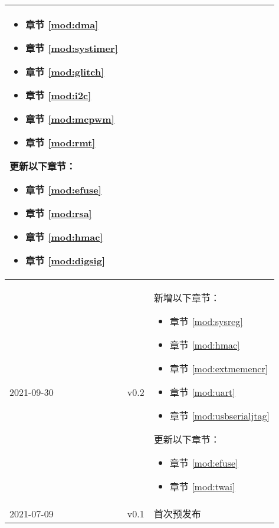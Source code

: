 \begin{longtable}[l]{ | m{2cm} | m{1.5cm} | m{12cm} | }
\begin{itemize}
            \item 章节 \ref{mod:dma} \textit{\nameref{mod:dma}}
            \item 章节 \ref{mod:systimer} \textit{\nameref{mod:systimer}}
            \item 章节 \ref{mod:glitch} \textit{\nameref{mod:glitch}}
            \item 章节 \ref{mod:i2c} \textit{\nameref{mod:i2c}}
            \item 章节 \ref{mod:mcpwm} \textit{\nameref{mod:mcpwm}}
            \item 章节 \ref{mod:rmt} \textit{\nameref{mod:rmt}}
        \end{itemize}
    更新以下章节：
        \begin{itemize}
            \item 章节 \ref{mod:efuse} \textit{\nameref{mod:efuse}}
            \item 章节 \ref{mod:rsa} \textit{\nameref{mod:rsa}}
            \item 章节 \ref{mod:hmac} \textit{\nameref{mod:hmac}}
            \item 章节 \ref{mod:digsig} \textit{\nameref{mod:digsig}}
        \end{itemize}
    \\\hline
    2021-09-30      & v0.2 &
        新增以下章节：
            \begin{itemize}
                \item 章节 \ref{mod:sysreg} \textit{\nameref{mod:sysreg}}
                \item 章节 \ref{mod:hmac} \textit{\nameref{mod:hmac}}
                \item 章节 \ref{mod:extmemencr} \textit{\nameref{mod:extmemencr}}
                \item 章节 \ref{mod:uart} \textit{\nameref{mod:uart}}
                \item 章节 \ref{mod:usbserialjtag} \textit{\nameref{mod:usbserialjtag}}
            \end{itemize}

    更新以下章节：
            \begin{itemize}
                \item 章节 \ref{mod:efuse} \textit{\nameref{mod:efuse}}
                \item 章节 \ref{mod:twai} \textit{\nameref{mod:twai}}
            \end{itemize}
            \\\hline
    2021-07-09 & v0.1 & 首次预发布\\\hline

\end{longtable}
